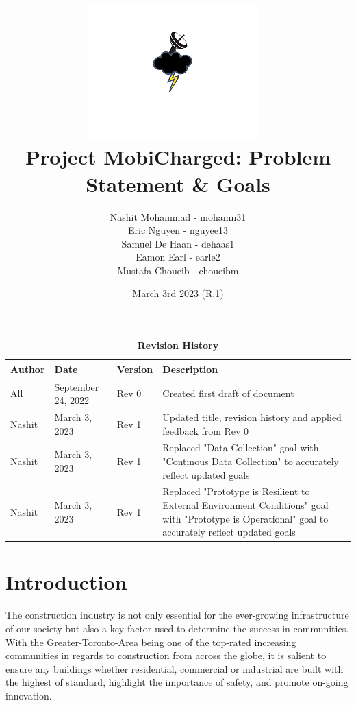 \documentclass[12pt,a4]{report}
\begin{document}
\title{%
\includegraphics[scale=1.5]{mobicharged.png}~\\
Project MobiCharged: Problem Statement \& Goals}
\author{Nashit Mohammad - mohamn31\\Eric Nguyen - nguyee13\\Samuel De Haan - dehaas1\\Eamon Earl - earle2\\Mustafa Choueib - choueibm}
\date{March 3rd 2023 (R.1)}

\maketitle

\newpage

\begin{center}
\begin{table}
	\caption{\bf Revision History}
	\begin{tabular}{p{2cm}p{3cm}p{2cm}p{6cm}}
		\hline
		\bf Author & \bf Date & \bf Version & \bf Description\\
		\hline
		All & September 24, 2022 & Rev 0 & Created first draft of document\\
		\hline
		Nashit & March 3, 2023 & Rev 1 & Updated title, revision history and applied feedback from Rev 0\\
		\hline
		Nashit & March 3, 2023 & Rev 1 & Replaced "Data Collection" goal with "Continous Data Collection" to accurately reflect updated goals\\
		\hline
		Nashit & March 3, 2023 & Rev 1 & Replaced "Prototype is Resilient to External Environment Conditions" goal with "Prototype is Operational" goal to accurately reflect updated goals\\
		\hline
	\end{tabular}
\end{table}
\end{center}

\clearpage

\section*{Introduction}
The construction industry is not only essential for the ever-growing infrastructure of our society but also a key factor used to determine the success in communities. With the Greater-Toronto-Area being one of the top-rated increasing communities in regards to construction from across the globe, it is salient to ensure any buildings whether residential, commercial or industrial are built with the highest of standard, highlight the importance of safety, and promote on-going innovation.
\end{document}
